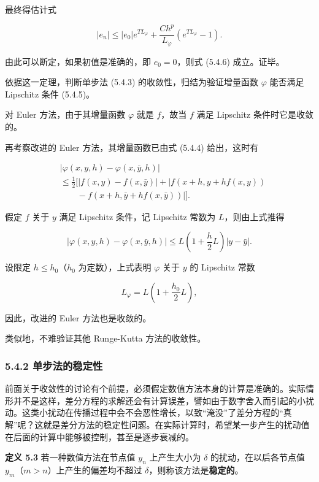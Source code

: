 最终得估计式

\[
|e_n|\leqslant|e_0|e^{TL_\varphi}+\frac{Ch^p}{L_\varphi}(e^{TL_\varphi}-1).\tag{5.4.10}
\]

由此可以断定，如果初值是准确的，即 \(e_0=0\)，则式 (5.4.6) 成立。证毕。

依据这一定理，判断单步法 (5.4.3) 的收敛性，归结为验证增量函数 \(\varphi\) 能否满足 Lipschitz 条件 (5.4.5)。

对 Euler 方法，由于其增量函数 \(\varphi\) 就是 \(f\)，故当 \(f\) 满足 Lipschitz 条件时它是收敛的。

再考察改进的 Euler 方法，其增量函数已由式 (5.4.4) 给出，这时有

\[
\begin{aligned}
&|\varphi(x,y,h)-\varphi(x,\bar y,h)|\\
&\leqslant\frac12\bigl[|f(x,y)-f(x,\bar y)|+|f(x+h,y+hf(x,y))\\
&\qquad-f(x+h,\bar y+hf(x,\bar y))|\bigr].
\end{aligned}
\]

假定 \(f\) 关于 \(y\) 满足 Lipschitz 条件，记 Lipschitz 常数为 \(L\)，则由上式推得

\[
|\varphi(x,y,h)-\varphi(x,\bar y,h)|\leqslant L\left(1+\frac{h}{2}L\right)|y-\bar y|.
\]

设限定 \(h\leqslant h_0\)（\(h_0\) 为定数），上式表明 \(\varphi\) 关于 \(y\) 的 Lipschitz 常数

\[
L_\varphi=L\left(1+\frac{h_0}{2}L\right),
\]

因此，改进的 Euler 方法也是收敛的。

类似地，不难验证其他 Runge-Kutta 方法的收敛性。

\subsubsection{5.4.2 单步法的稳定性}\label{ch05a-ux5355ux6b65ux6cd5ux7684ux7a33ux5b9aux6027}

前面关于收敛性的讨论有个前提，必须假定数值方法本身的计算是准确的。实际情形并不是这样，差分方程的求解还会有计算误差，譬如由于数字舍入而引起的小扰动。这类小扰动在传播过程中会不会恶性增长，以致``淹没''了差分方程的``真解''呢？这就是差分方法的稳定性问题。在实际计算时，希望某一步产生的扰动值在后面的计算中能够被控制，甚至是逐步衰减的。

\textbf{定义 5.3} 若一种数值方法在节点值 \(y_n\) 上产生大小为 \(\delta\) 的扰动，在以后各节点值 \(y_m\)（\(m>n\)）上产生的偏差均不超过 \(\delta\)，则称该方法是\textbf{稳定的}。

